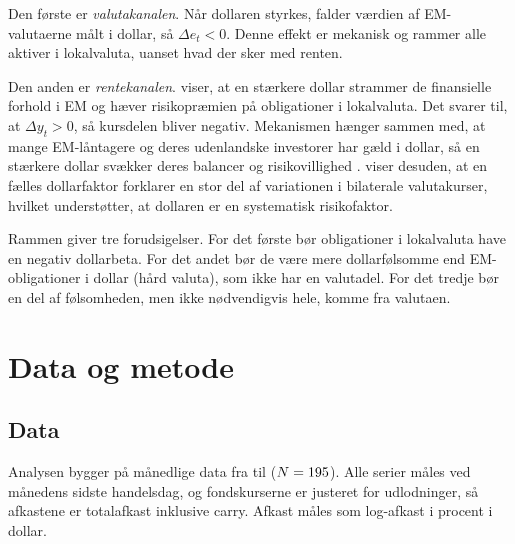 \documentclass[11pt,a4paper]{article}
\begin{document}
Den første er \emph{valutakanalen}. Når dollaren styrkes, falder værdien af EM-valutaerne målt i dollar, så $\Delta e_t < 0$. Denne effekt er mekanisk og rammer alle aktiver i lokalvaluta, uanset hvad der sker med renten.

Den anden er \emph{rentekanalen}. \citet{hofmann2020} viser, at en stærkere dollar strammer de finansielle forhold i EM og hæver risikopræmien på obligationer i lokalvaluta. Det svarer til, at $\Delta y_t > 0$, så kursdelen bliver negativ. Mekanismen hænger sammen med, at mange EM-låntagere og deres udenlandske investorer har gæld i dollar, så en stærkere dollar svækker deres balancer og risikovillighed \citep{avdjiev2019}. \citet{verdelhan2018} viser desuden, at en fælles dollarfaktor forklarer en stor del af variationen i bilaterale valutakurser, hvilket understøtter, at dollaren er en systematisk risikofaktor.

Rammen giver tre forudsigelser. For det første bør obligationer i lokalvaluta have en negativ dollarbeta. For det andet bør de være mere dollarfølsomme end EM-obligationer i dollar (hård valuta), som ikke har en valutadel. For det tredje bør en del af følsomheden, men ikke nødvendigvis hele, komme fra valutaen.

\section{Data og metode}

\subsection{Data}

Analysen bygger på månedlige data fra \SampleStart{} til \SampleEnd{} ($N=195$). \PartialNote{} Alle serier måles ved månedens sidste handelsdag, og fondskurserne er justeret for udlodninger, så afkastene er totalafkast inklusive carry. Afkast måles som log-afkast i procent i dollar.
\end{document}
